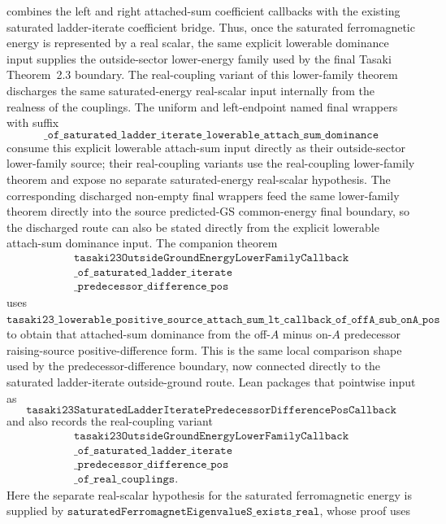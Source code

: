 \documentclass[a4paper,11pt]{article}
\begin{document}
combines the left and right attached-sum coefficient callbacks with the
existing saturated ladder-iterate coefficient bridge.  Thus, once the
saturated ferromagnetic energy is represented by a real scalar, the same
explicit lowerable dominance input supplies the outside-sector lower-energy
family used by the final Tasaki Theorem~2.3 boundary.  The real-coupling
variant of this lower-family theorem discharges the same saturated-energy
real-scalar input internally from the realness of the couplings.  The
uniform and left-endpoint named final wrappers with suffix
\[
\texttt{\_of\_saturated\_ladder\_iterate\_lowerable\_attach\_sum\_dominance}
\]
consume this explicit lowerable attach-sum input directly as their
outside-sector lower-family source; their real-coupling variants use the
real-coupling lower-family theorem and expose no separate saturated-energy
real-scalar hypothesis.  The corresponding discharged non-empty final
wrappers feed the same lower-family theorem directly into the source
predicted-GS common-energy final boundary, so the discharged route can also be
stated directly from the explicit lowerable attach-sum dominance input.
The companion theorem
\[
\begin{gathered}
\texttt{tasaki23OutsideGroundEnergyLowerFamilyCallback}\\
\texttt{\_of\_saturated\_ladder\_iterate}\\
\texttt{\_predecessor\_difference\_pos}
\end{gathered}
\]
uses
\(\texttt{tasaki23\_lowerable\_positive\_source\_attach\_sum\_lt\_callback\_of\_offA\_sub\_onA\_pos}\)
to obtain that attached-sum dominance from the off-\(A\) minus on-\(A\)
predecessor raising-source positive-difference form.  This is the same local
comparison shape used by the predecessor-difference boundary, now connected
directly to the saturated ladder-iterate outside-ground route.  Lean packages
that pointwise input as
\[
\texttt{tasaki23SaturatedLadderIteratePredecessorDifferencePosCallback}
\]
and also records the real-coupling variant
\[
\begin{gathered}
\texttt{tasaki23OutsideGroundEnergyLowerFamilyCallback}\\
\texttt{\_of\_saturated\_ladder\_iterate}\\
\texttt{\_predecessor\_difference\_pos}\\
\texttt{\_of\_real\_couplings}.
\end{gathered}
\]
Here the separate real-scalar hypothesis for the saturated ferromagnetic
energy is supplied by
\(\texttt{saturatedFerromagnetEigenvalueS\_exists\_real}\), whose proof uses
\end{document}

